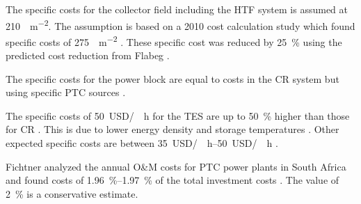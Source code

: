The specific costs for the collector field including the HTF system is assumed at \SI{210}{\usd\per\square\metre}. The assumption is based on a 2010 cost calculation study which found specific costs of \SI{275}{\usd\per\square\metre} \cite{Morin2012}. These specific cost was reduced by \SI{25}{\percent} using the predicted cost reduction from Flabeg \cite{FLABEG_FE_GmbH2015}.

The specific costs for the power block are equal to costs in the CR system but using specific PTC sources \cite{Platzer2014}.


The specific costs of \SI{50}{USD/\kilo\wattth\hour} for the TES are up to \SI{50}{\percent} higher than those for CR \cite{Platzer2014}. This is due to lower energy density and storage temperatures \cite{Steinmann2015}. Other expected specific costs are between \SIrange{35}{50}{USD/\kilo\wattth\hour} \cite{Steinmann2012}.

Fichtner analyzed the annual O\&M costs for PTC power plants in South Africa and found costs of \SIrange{1.96}{1.97}{\percent} of the total investment costs \cite{Fichtner2010}. The value of \SI{2}{\percent} is a conservative estimate.


